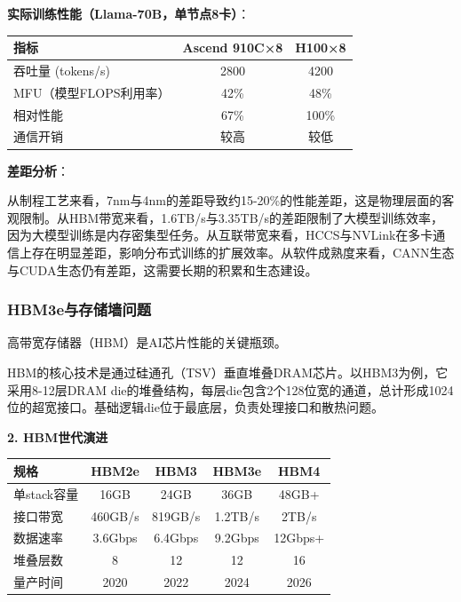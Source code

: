 \textbf{实际训练性能（Llama-70B，单节点8卡）}：

\begin{table}[H]
\centering
\small
\begin{tabular}{lcc}
\toprule
\textbf{指标} & \textbf{Ascend 910C×8} & \textbf{H100×8} \\
\midrule
吞吐量 (tokens/s) & 2800 & 4200 \\
MFU（模型FLOPS利用率） & 42\% & 48\% \\
相对性能 & 67\% & 100\% \\
通信开销 & 较高 & 较低 \\
\bottomrule
\end{tabular}
\end{table}

\textbf{差距分析}：

从制程工艺来看，7nm与4nm的差距导致约15-20\%的性能差距，这是物理层面的客观限制。从HBM带宽来看，1.6TB/s与3.35TB/s的差距限制了大模型训练效率，因为大模型训练是内存密集型任务。从互联带宽来看，HCCS与NVLink在多卡通信上存在明显差距，影响分布式训练的扩展效率。从软件成熟度来看，CANN生态与CUDA生态仍有差距，这需要长期的积累和生态建设。

\subsubsection{HBM3e与存储墙问题}

高带宽存储器（HBM）是AI芯片性能的关键瓶颈\cite{SKHynix2024HBM, Samsung2024HBM3e, ISSCC2024HBM}。

HBM的核心技术是通过硅通孔（TSV）垂直堆叠DRAM芯片。以HBM3为例，它采用8-12层DRAM die的堆叠结构，每层die包含2个128位宽的通道，总计形成1024位的超宽接口。基础逻辑die位于最底层，负责处理接口和散热问题。

\textbf{2. HBM世代演进}

\begin{table}[H]
\centering
\small
\begin{tabular}{lcccc}
\toprule
\textbf{规格} & \textbf{HBM2e} & \textbf{HBM3} & \textbf{HBM3e} & \textbf{HBM4} \\
\midrule
单stack容量 & 16GB & 24GB & 36GB & 48GB+ \\
接口带宽 & 460GB/s & 819GB/s & 1.2TB/s & 2TB/s \\
数据速率 & 3.6Gbps & 6.4Gbps & 9.2Gbps & 12Gbps+ \\
堆叠层数 & 8 & 12 & 12 & 16 \\
量产时间 & 2020 & 2022 & 2024 & 2026 \\
\bottomrule
\end{tabular}
\end{table}

